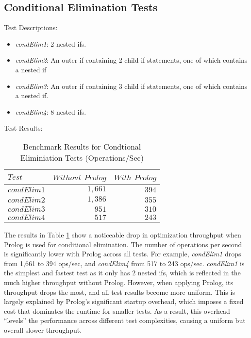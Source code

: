 \subsection*{Conditional Elimination Tests}

Test Descriptions:
\begin{itemize}
    \item \textit{condElim1}: 2 nested ifs.
    \item \textit{condElim2}: An outer if containing 2 child if statements, one of which contains a nested if
    \item \textit{condElim3}: An outer if containing 3 child if statements, one of which contains a nested if.
    \item \textit{condElim4}: 8 nested ifs.
\end{itemize}

Test Results:
\begin{table}[h]
    \centering
    \begin{tabular}{|l|r|r|}
        \hline
        $Test$ & $Without$ $Prolog$ & $With$ $Prolog$ \\
        \hline
        $condElim1$ & $1,661$ & $394$ \\
        $condElim2$ & $1,386$ & $355$ \\
        $condElim3$ & $951$ & $310$ \\
        $condElim4$ & $517$ & $243$ \\
        \hline
    \end{tabular}
    \caption{Benchmark Results for Condtional Eliminiation Tests (Operations/Sec)}
    \label{table:condElimination}
\end{table} 
\smallbreak

\vspace{-10pt}
The results in Table \ref{table:condElimination} show a noticeable drop in optimization throughput when Prolog is used for conditional elimination. The number of operations per second is significantly lower with Prolog across all tests. For example, \textit{condElim1} drops from 1,661 to 394 ops/sec, and \textit{condElim4} from 517 to 243 ops/sec. \textit{condElim1} is the simplest and fastest test as it only has 2 nested ifs, which is reflected in the much higher throughput without Prolog. However, when applying Prolog, its throughput drops the most, and all test results become more uniform. This is largely explained by Prolog’s significant startup overhead, which imposes a fixed cost that dominates the runtime for smaller tests. As a result, this overhead “levels” the performance across different test complexities, causing a uniform but overall slower throughput.
